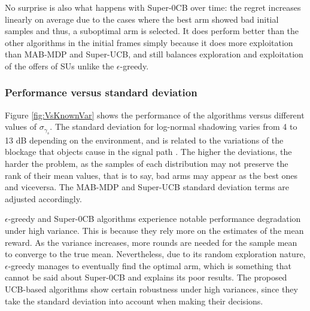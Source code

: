 No surprise is also what happens with Super-0CB over time: the regret increases linearly on average due to the cases where the best arm showed bad initial samples and thus, a suboptimal arm is selected. 
It does perform better than the other algorithms in the initial frames simply because it does more exploitation than MAB-MDP and Super-UCB, and still balances exploration and exploitation of the offers of SUs unlike the $\epsilon$-greedy.

\subsubsection{Performance versus standard deviation}

Figure \ref{fig:VsKnownVar} shows the performance of the algorithms versus different values of $\sigma_{\gamma_s}$. The standard deviation for log-normal shadowing varies from 4 to 13 dB depending on the environment, and is related to the variations of the blockage that objects cause in the signal path \cite{ref:Goldsmith2005}. The higher the deviations, the harder the problem, as the samples of each distribution may not preserve the rank of their mean values, that is to say, bad arms may appear as the best ones and viceversa. The MAB-MDP and Super-UCB standard deviation terms are adjusted accordingly. 

$\epsilon$-greedy and Super-0CB algorithms experience notable performance degradation under high variance. This is because they rely more on the estimates of the mean reward. As the variance increases, more rounds are needed for the sample mean to converge to the true mean. Nevertheless, due to its random exploration nature, $\epsilon$-greedy manages to eventually find the optimal arm, which is something that cannot be said about Super-0CB and explains its poor results. 
The proposed UCB-based algorithms show certain robustness under high variances, since they take the standard deviation into account when making their decisions. 
 
